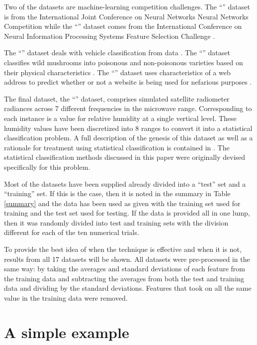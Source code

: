 Two of the datasets are machine-learning competition challenges.
The ``'' dataset is from the International Joint Conference on Neural
Networks Neural Networks Competition\citep{Feldkamp_Puskorius1998} while the ``'' dataset comes 
from the International Conference on Neural Information Processing Systems
Feature Selection Challenge \citep{Guyon_etal2004}.

The ``'' dataset deals with vehicle classification from  data
\citep{Duarte_Hu2004}.
The ``'' dataset classifies wild mushrooms
into poisonous and non-poisonous varieties based on their physical characteristics \citep{Iba_etal1988}.
The ``'' dataset uses characteristics of a web address to predict whether
or not a website is being used for nefarious purposes \citep{Mohommad_etal2014}.

The final dataset, the ``'' dataset, 
comprises simulated satellite radiometer radiances across 7 different frequencies in the microwave range.
Corresponding to each instance is a value for relative humidity at a single
vertical level.
These humidity values have been discretized into 8 ranges to convert it into a statistical classification problem.
A full description of the genesis of this dataset as well as a rationale for
treatment using statistical classification is contained in \citet{Mills2009}.
The statistical classification methods discussed in this paper were originally
devised specifically for this problem.

Most of the datasets have been supplied already divided into a ``test'' set and a ``training'' set.
If this is the case, then it is noted in the summary in Table \ref{summary}
and the data has been used as given with the training set used for training
and the test set used for testing.
If the data is provided all in one lump, then it was randomly divided into 
test and training sets with the division different for each of the ten numerical trials.

To provide the best idea of when the technique is effective and when it is
not, results from all 17 datasets will be shown. 
All datasets were pre-processed in the same way: by taking the averages and
standard deviations of each feature from the training data and subtracting
the averages from both the test and training data and dividing by the 
standard deviations.
Features that took on all the same value in the training data were removed.


\section{A simple example}

